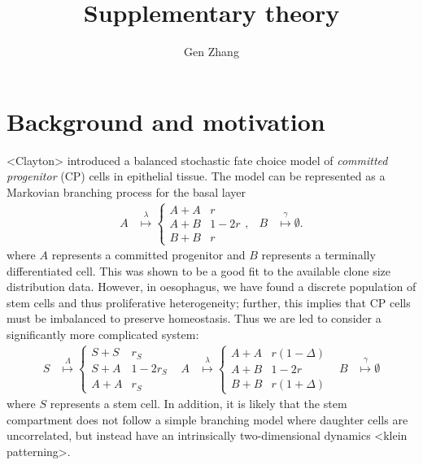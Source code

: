\documentclass[10pt,UKenglish]{article}
\begin{document}
\title{Supplementary theory}
\author{Gen Zhang}
 
\maketitle

\renewcommand{\thesection}{S-\Roman{section}}

\section{\label{sec:introduction}Background and motivation}

<Clayton> introduced a balanced stochastic fate choice model of \emph{committed progenitor} (CP) cells in epithelial tissue. The model can be represented as a Markovian branching process for the basal layer 
\begin{align}
A &\overset{\lambda}{\longmapsto} \begin{cases}
A+A & r \\
A+B & 1-2r \\
B+B & r\end{cases}, & B &\overset{\gamma}{\longmapsto} \emptyset.
\label{eq:basal-model}
\end{align}
where $A$ represents a committed progenitor and $B$ represents a terminally differentiated cell. This was shown to be a good fit to the available clone size distribution data. However, in oesophagus, we have found a discrete population of stem cells and thus proliferative heterogeneity; further, this implies that CP cells must be imbalanced to preserve homeostasis. Thus we are led to consider a significantly more complicated system: 
\begin{align}
S &\overset{\Lambda}{\longmapsto} \begin{cases}
S+S & r_S \\
S+A & 1-2r_S \\
A+A & r_S\end{cases} & A &\overset{\lambda}{\longmapsto} \begin{cases}
A+A & r(1-\Delta) \\
A+B & 1-2r \\
B+B & r(1+\Delta)\end{cases} & B &\overset{\gamma}{\longmapsto} \emptyset
\label{eq:really-full-model}
\end{align}
where $S$ represents a stem cell. In addition, it is likely that the stem compartment does not follow a simple branching model where daughter cells are uncorrelated, but instead have an intrinsically two-dimensional dynamics <klein patterning>.
\end{document}

